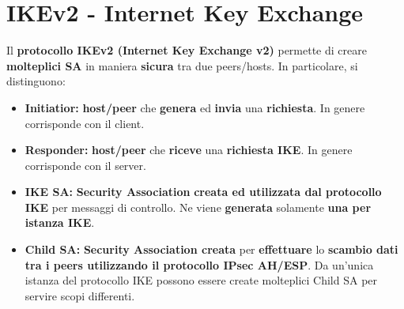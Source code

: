 \section{IKEv2 - Internet Key Exchange}
\begin{definition}[IKEv2]\label{def:ikev2}
Il \textbf{protocollo IKEv2 (Internet Key Exchange v2)} permette di creare \textbf{molteplici SA} in maniera \textbf{sicura} tra due peers/hosts. In particolare, si distinguono:
\begin{itemize}
    \item \textbf{Initiatior:} \textbf{host/peer} che \textbf{genera} ed \textbf{invia} una \textbf{richiesta}. In genere corrisponde con il client.
    \item \textbf{Responder:} \textbf{host/peer} che \textbf{riceve} una \textbf{richiesta IKE}. In genere corrisponde con il server.
    \item \textbf{IKE SA:} \textbf{Security Association} \textbf{creata ed utilizzata dal protocollo IKE} per messaggi di controllo. Ne viene \textbf{generata} solamente \textbf{una per istanza IKE}.
    \item \textbf{Child SA:} \textbf{Security Association creata} per \textbf{effettuare} lo \textbf{scambio dati tra i peers utilizzando il protocollo IPsec AH/ESP}. Da un’unica istanza del protocollo IKE possono essere create molteplici Child SA per servire scopi differenti.
\end{itemize}
\end{definition}
